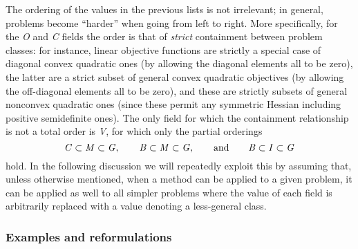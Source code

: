 The ordering of the values in the previous lists is not irrelevant; in general, problems become ``harder'' when going from left to right. More specifically, for the \textit{O} and \textit{C} fields the order is that of \emph{strict} containment between problem classes: for instance, linear objective functions are strictly a special case of diagonal convex quadratic ones (by allowing the diagonal elements all to be zero), the latter are a strict subset of general convex quadratic objectives (by allowing the off-diagonal elements all to be zero), and these are strictly subsets of general nonconvex quadratic ones (since these permit any symmetric Hessian including positive semidefinite ones). The only field for which the containment relationship is not a total order is \textit{V}, for which only the partial orderings
\[
 \mbox{\textit{C}} \subset \mbox{\textit{M}} \subset \mbox{\textit{G}},
 \qquad
 \mbox{\textit{B}} \subset \mbox{\textit{M}} \subset \mbox{\textit{G}},
 \qquad
 \mbox{and}
 \qquad
 \mbox{\textit{B}} \subset \mbox{\textit{I}} \subset \mbox{\textit{G}}
\]
hold. In the following discussion we will repeatedly exploit this by assuming that, unless otherwise mentioned, when a method can be applied to a given problem, it can be applied as well to all simpler problems where the value of each field is arbitrarily replaced with a value denoting a less-general class.


\subsubsection{Examples and reformulations}\label{ssec:reform}

